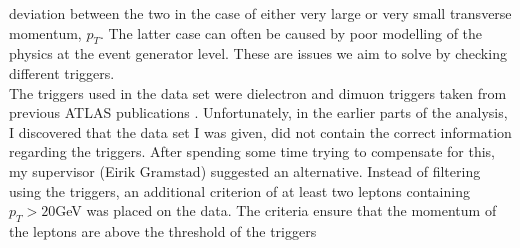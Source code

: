 deviation between the two in the case of either very large or very small transverse momentum, $p_T$. The latter case can 
often be caused by poor modelling of the physics at the event generator level. These are issues we aim to solve by checking
different triggers. 
\\
The triggers used in the data set were dielectron and dimuon triggers taken from previous \ac{ATLAS} publications 
\cite{atlas_collaboration_performance_2017, atlas_collaboration_performance_muons, atlas_collaboration_photons}.
Unfortunately, in the earlier parts of the analysis, I discovered that the data set I was given, did not contain the correct information 
regarding the triggers. After spending some time trying to compensate for this, my supervisor (Eirik Gramstad) suggested an alternative.
Instead of filtering using the triggers, an additional criterion of at least two leptons containing $p_T>20$GeV was placed on the data.
The criteria ensure that the momentum of the leptons are above the threshold of the triggers

